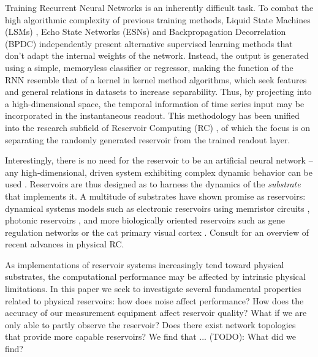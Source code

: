 Training Recurrent Neural Networks is an inherently difficult task. To combat
the high algorithmic complexity of previous training methods, Liquid State
Machines (LSMs) \cite{maass_real-time_2002}, Echo State Networks (ESNs)
\cite{jaeger_echo_2001} and Backpropagation Decorrelation (BPDC)
\cite{steil_backpropagation-decorrelation:_2004} independently present
alternative supervised learning methods that don't adapt the internal weights of
the network. Instead, the output is generated using a simple, memoryless
classifier or regressor, making the function of the RNN resemble that of a
kernel in kernel method algorithms, which seek features and general relations in
datasets to increase separability. Thus, by projecting into a high-dimensional
space, the temporal information of time series input may be incorporated in the
instantaneous readout. This methodology has been unified into the research
subfield of Reservoir Computing (RC) \cite{schrauwen_overview_2007}, of which
the focus is on separating the randomly generated reservoir from the trained
readout layer.

Interestingly, there is no need for the reservoir to be an artificial neural
network -- any high-dimensional, driven system exhibiting complex dynamic
behavior can be used \cite{schrauwen_overview_2007}. Reservoirs are thus
designed as to harness the dynamics of the \textit{substrate} that implements
it. A multitude of substrates have shown promise as reservoirs: dynamical
systems models such as electronic reservoirs using memristor circuits
\cite{kulkarni_memristor-based_2012}, photonic reservoirs
\cite{vandoorne_experimental_2014}, and more biologically oriented reservoirs
such as gene regulation networks \cite{jones_is_2007} or the cat primary visual
cortex \cite{scholkopf_temporal_2007}. Consult \cite{tanaka_recent_2018} for an
overview of recent advances in physical RC.

As implementations of reservoir systems increasingly tend toward physical
substrates, the computational performance may be affected by intrinsic physical
limitations. In this paper we seek to investigate several fundamental properties
related to physical reservoirs: how does noise affect performance? How does the
accuracy of our measurement equipment affect reservoir quality? What if we are
only able to partly observe the reservoir? Does there exist network topologies
that provide more capable reservoirs? We find that ... (TODO): What did we find?



